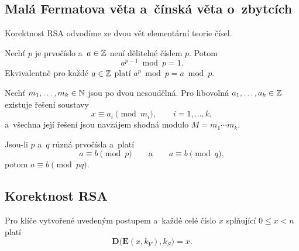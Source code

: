\subsection{Malá Fermatova věta a~čínská věta o~zbytcích}

Korektnost RSA odvodíme ze dvou vět elementární teorie čísel.

\begin{theorem}\label{thm:krypto-fermat}
    Nechť $p$ je prvočíslo a~$a\in\mathbb{Z}$ není dělitelné číslem $p$. Potom
    \[
        a^{p-1}\bmod p=1.
    \]
    Ekvivalentně pro každé $a\in\mathbb{Z}$ platí $a^p\bmod p=a\bmod p$.
\end{theorem}

\begin{theorem}\label{thm:krypto-cinska}
    Nechť $m_1,\ldots,m_k\in\mathbb{N}$ jsou po dvou nesoudělná. Pro libovolná $a_1,\ldots,a_k\in\mathbb{Z}$ existuje řešení soustavy
    \[
        x\equiv a_i\pmod{m_i},
        \qquad i=1,\ldots,k,
    \]
    a~všechna její řešení jsou navzájem shodná modulo $M=m_1\cdots m_k$.
\end{theorem}

\begin{corollary}\label{cor:krypto-cinska-dve}
    Jsou-li $p$ a~$q$ různá prvočísla a~platí
    \[
        a\equiv b\pmod p
        \qquad\text{a}\qquad
        a\equiv b\pmod q,
    \]
    potom $a\equiv b\pmod{pq}$.
\end{corollary}

\subsection{Korektnost RSA}

\begin{theorem}\label{thm:krypto-rsa-korektnost}
    Pro klíče vytvořené uvedeným postupem a~každé celé číslo $x$ splňující $0\leqslant x<n$ platí
    \[
        \mathbf{D}\bigl(\mathbf{E}(x,k_V),k_S\bigr)=x.
    \]
\end{theorem}

